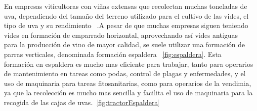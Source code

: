 En empresas viticultoras con viñas extensas que recolectan muchas toneladas de uva, dependiendo del tamaño del terreno utilizado para el cultivo de las vides, 
el tipo de uva y su rendimiento ~\cite{RendimientoViticultura}.A pesar de que muchas empresas siguen teniendo vides en formación de emparrado horizontal, aprovechando así vides antiguas para la producción de vino de mayor calidad, 
se suele utilizar una formación de parras verticales, denominada formación espaldera ~\ref{fig:espaldera}. Esta formación en espaldera es mucho mas eficiente para trabajar, 
tanto para operarios de mantenimiento en tareas como podas, control de plagas y enfermedades, y el uso de maquinaria para tareas fitosanitarias, como para operarios de la vendimia, ya que la recolección es mucho mas sencilla 
y facilita el uso de maquinaria para la recogida de las cajas de uvas.~\ref{fig:tractorEspaldera}


